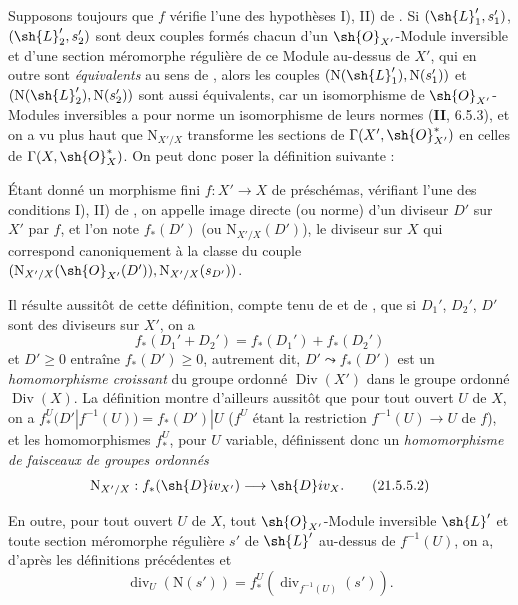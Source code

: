 \begin{env}[21.5.4]
\label{IV.21.5.4}
Supposons toujours que $f$ vérifie l'une des hypothèses I), II) de .
Si $(\sh{L}_1',s_1')$, $(\sh{L}_2',s_2')$ sont deux couples formés chacun d'un $\sh{O}_{X'}$-Module inversible et d'une section méromorphe régulière de ce Module au-dessus de $X'$, qui en outre sont \emph{équivalents} au sens de , alors les couples $(\mathrm{N}(\sh{L}_1'),\mathrm{N}(s_1'))$ et $(\mathrm{N}(\sh{L}_2'),\mathrm{N}(s_2'))$ sont aussi équivalents, car un isomorphisme de $\sh{O}_{X'}$-Modules inversibles a pour norme un isomorphisme de leurs normes (\textbf{II}, 6.5.3), et on a vu plus haut que $\mathrm{N}_{X'/X}$ transforme les sections de $\Gamma(X',\sh{O}_{X'}^*)$ en celles de $\Gamma(X,\sh{O}_X^*)$.
On peut donc poser la définition suivante :
\end{env}


\begin{definition}[21.5.5]
Étant donné un morphisme fini $f:X'\to X$ de préschémas, vérifiant l'une des conditions \textup{I), II)} de , on appelle image directe (ou norme) d'un diviseur $D'$ sur $X'$ par $f$, et l'on note $f_*(D')$ \textup{(}ou $\mathrm{N}_{X'/X}(D')$\textup{)}, le diviseur sur $X$ qui correspond canoniquement  à la classe du couple $(\mathrm{N}_{X'/X}(\sh{O}_{X'}(D')),\mathrm{N}_{X'/X}(s_{D'}))$.
\end{definition}

Il résulte aussitôt de cette définition, compte tenu de  et de , que si $D_1'$, $D_2'$, $D'$ sont des diviseurs sur $X'$, on a
\[
\label{IV.21.5.5.1}
  f_*(D_1'+D_2')=f_*(D_1')+f_*(D_2')
  \tag{21.5.5.1}
\]
et $D'\geq0$ entraîne $f_*(D')\geq0$, autrement dit, $D'\leadsto f_*(D')$ est un \emph{homomorphisme croissant} du groupe ordonné $\operatorname{Div}(X')$ dans le groupe ordonné $\operatorname{Div}(X)$.
La définition  montre d'ailleurs aussitôt que pour tout ouvert $U$ de $X$, on a $f_*^U(D'|f^{-1}(U))=f_*(D')|U$ ($f^U$ étant la restriction $f^{-1}(U)\to U$ de $f$), et les homomorphismes $f_*^U$, pour $U$ variable, définissent donc un \emph{homomorphisme de faisceaux de groupes ordonnés}
\[
\label{IV.21.5.5.2}
  \mathrm{N}_{X'/X}:f_*(\sh{D}iv_{X'})\to\sh{D}iv_X.
  \tag{21.5.5.2}
\]

En outre, pour tout ouvert $U$ de $X$, tout $\sh{O}_{X'}$-Module inversible $\sh{L}'$ et toute section méromorphe régulière $s'$ de $\sh{L}'$ au-dessus de $f^{-1}(U)$, on a, d'après les définitions précédentes et 
\[
\label{IV.21.5.5.3}
  \operatorname{div}_U(\mathrm{N}(s'))=f_*^U(\operatorname{div}_{f^{-1}(U)}(s')).
  \tag{21.5.5.3}
\]


